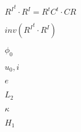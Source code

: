 \documentclass{article}
\begin{document}
${R^I}^t \cdot R^I = R^t C^t \cdot C R $
\pagebreak

$ inv({R^I}^t \cdot R^I)$
\pagebreak

$\phi_0$
\pagebreak

$ u_0,i$
\pagebreak

$e$
\pagebreak

$L_2$
\pagebreak

$\kappa$
\pagebreak

$H_1$
\pagebreak
\end{document}
